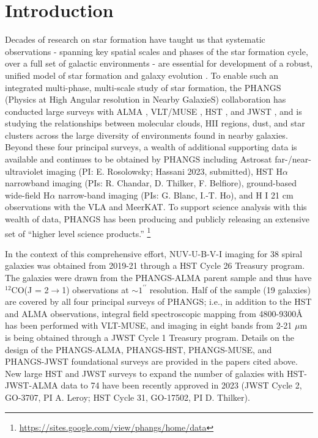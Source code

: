 \documentclass[]{aastex631}
\begin{document}
\section{Introduction} \label{sec:intro}
Decades of research on star formation have taught us that systematic observations - spanning key spatial scales and phases of the star formation cycle, over a full set of galactic environments - are essential for development of a robust, unified model of star formation and galaxy evolution \citep[e.g.][]{kennicutt_star_2012}.  To enable such an integrated multi-phase, multi-scale study of star formation, the PHANGS (Physics at High Angular resolution in Nearby GalaxieS) collaboration \citep{schinnerer_physics_2019} has conducted large surveys with ALMA \citep{leroy_phangs-alma_2021}, VLT/MUSE \citep{emsellem_phangs-muse_2022}, HST \citep{lee_phangs-hst_2022}, and JWST \citep{lee_phangs-jwst_2023}, and is studying the relationships between molecular clouds, HII regions, dust, and star clusters across the large diversity of environments found in nearby galaxies. Beyond these four principal surveys, a wealth of additional supporting data is available and continues to be obtained by PHANGS including Astrosat far-/near-ultraviolet imaging (PI: E. Rosolowsky; Hassani 2023, submitted), HST H$\alpha$ narrowband imaging (PIs: R. Chandar, D. Thilker, F. Belfiore), ground-based wide-field H$\alpha$ narrow-band imaging (PIs: G. Blanc, I.-T. Ho), and H I 21 cm observations with the VLA and MeerKAT.  To support science analysis with this wealth of data, PHANGS has been producing and publicly releasing an extensive set of ``higher level science products.'' \footnote{\url{https://sites.google.com/view/phangs/home/data}}

In the context of this comprehensive effort, NUV-U-B-V-I imaging for 38 spiral galaxies was obtained from 2019-21 through a HST Cycle 26 Treasury program.  The galaxies were drawn from the PHANGS-ALMA parent sample and thus have $^{12}$CO(J = 2$\rightarrow$1) observations at $\sim1^{\prime\prime}$ resolution.  Half of the sample (19 galaxies) are covered by all four principal surveys of PHANGS; i.e., in addition to the HST and ALMA observations, integral field spectroscopic mapping from 4800-9300\AA\, has been performed with VLT-MUSE, and imaging in eight bands from 2-21 $\mu$m is being obtained through a JWST Cycle 1 Treasury program.  Details on the design of the PHANGS-ALMA, PHANGS-HST, PHANGS-MUSE, and PHANGS-JWST foundational surveys are provided in the papers cited above.  New large HST and JWST surveys to expand the number of galaxies with HST-JWST-ALMA data to 74 have been recently approved in 2023 (JWST Cycle 2, GO-3707, PI A. Leroy; HST Cycle 31, GO-17502, PI D. Thilker).
\end{document}
